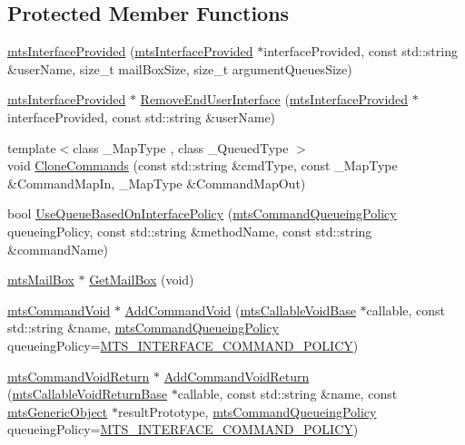 \subsection*{Protected Member Functions}
\begin{DoxyCompactItemize}
\item 
\hyperlink{classmts_interface_provided_aae817ee7252b13bcae68eb8cc414cb51}{mts\+Interface\+Provided} (\hyperlink{classmts_interface_provided}{mts\+Interface\+Provided} $\ast$interface\+Provided, const std\+::string \&user\+Name, size\+\_\+t mail\+Box\+Size, size\+\_\+t argument\+Queues\+Size)
\item 
\hyperlink{classmts_interface_provided}{mts\+Interface\+Provided} $\ast$ \hyperlink{classmts_interface_provided_a18304c0f5cb76444473eaf8b018fe471}{Remove\+End\+User\+Interface} (\hyperlink{classmts_interface_provided}{mts\+Interface\+Provided} $\ast$interface\+Provided, const std\+::string \&user\+Name)
\item 
{\footnotesize template$<$class \+\_\+\+Map\+Type , class \+\_\+\+Queued\+Type $>$ }\\void \hyperlink{classmts_interface_provided_a49bdd7b3dc270b5622e9579ece4b5589}{Clone\+Commands} (const std\+::string \&cmd\+Type, const \+\_\+\+Map\+Type \&Command\+Map\+In, \+\_\+\+Map\+Type \&Command\+Map\+Out)
\item 
bool \hyperlink{classmts_interface_provided_a6fb18b9649748be4f388ef19f11ceeb3}{Use\+Queue\+Based\+On\+Interface\+Policy} (\hyperlink{mts_forward_declarations_8h_aa2ac24035e136fa1689dcc2854c63fc7}{mts\+Command\+Queueing\+Policy} queueing\+Policy, const std\+::string \&method\+Name, const std\+::string \&command\+Name)
\item 
\hyperlink{classmts_mail_box}{mts\+Mail\+Box} $\ast$ \hyperlink{classmts_interface_provided_a1991a4296807d19fa5d5d55d02f2c45f}{Get\+Mail\+Box} (void)
\item 
\hyperlink{classmts_command_void}{mts\+Command\+Void} $\ast$ \hyperlink{classmts_interface_provided_a902d9dc8912c02325c40a40c318fc12d}{Add\+Command\+Void} (\hyperlink{classmts_callable_void_base}{mts\+Callable\+Void\+Base} $\ast$callable, const std\+::string \&name, \hyperlink{mts_forward_declarations_8h_aa2ac24035e136fa1689dcc2854c63fc7}{mts\+Command\+Queueing\+Policy} queueing\+Policy=\hyperlink{mts_forward_declarations_8h_aa2ac24035e136fa1689dcc2854c63fc7a4f444b4120a5e2efd084e2e5a214f5c8}{M\+T\+S\+\_\+\+I\+N\+T\+E\+R\+F\+A\+C\+E\+\_\+\+C\+O\+M\+M\+A\+N\+D\+\_\+\+P\+O\+L\+I\+C\+Y})
\item 
\hyperlink{classmts_command_void_return}{mts\+Command\+Void\+Return} $\ast$ \hyperlink{classmts_interface_provided_ab0984ae6d18a845940269f727833000f}{Add\+Command\+Void\+Return} (\hyperlink{classmts_callable_void_return_base}{mts\+Callable\+Void\+Return\+Base} $\ast$callable, const std\+::string \&name, const \hyperlink{classmts_generic_object}{mts\+Generic\+Object} $\ast$result\+Prototype, \hyperlink{mts_forward_declarations_8h_aa2ac24035e136fa1689dcc2854c63fc7}{mts\+Command\+Queueing\+Policy} queueing\+Policy=\hyperlink{mts_forward_declarations_8h_aa2ac24035e136fa1689dcc2854c63fc7a4f444b4120a5e2efd084e2e5a214f5c8}{M\+T\+S\+\_\+\+I\+N\+T\+E\+R\+F\+A\+C\+E\+\_\+\+C\+O\+M\+M\+A\+N\+D\+\_\+\+P\+O\+L\+I\+C\+Y})

\end{DoxyCompactItemize}
